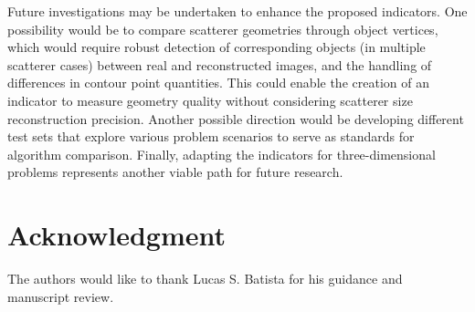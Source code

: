 \documentclass{IEEEtran}
\begin{document}
    
        Future investigations may be undertaken to enhance the proposed indicators. One possibility would be to compare scatterer geometries through object vertices, which would require robust detection of corresponding objects (in multiple scatterer cases) between real and reconstructed images, and the handling of differences in contour point quantities. This could enable the creation of an indicator to measure geometry quality without considering scatterer size reconstruction precision. Another possible direction would be developing different test sets that explore various problem scenarios to serve as standards for algorithm comparison. Finally, adapting the indicators for three-dimensional problems represents another viable path for future research.

    \appendices
    
    \section*{Acknowledgment}
    
    The authors would like to thank Lucas S. Batista for his guidance and manuscript review.
    
    
    
    
        
\end{document}
